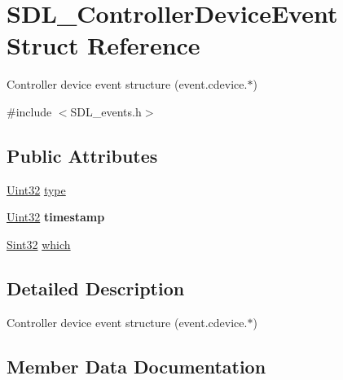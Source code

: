 \hypertarget{struct_s_d_l___controller_device_event}{}\section{S\+D\+L\+\_\+\+Controller\+Device\+Event Struct Reference}
\label{struct_s_d_l___controller_device_event}


Controller device event structure (event.\+cdevice.$\ast$)  




{\ttfamily \#include $<$S\+D\+L\+\_\+events.\+h$>$}

\subsection*{Public Attributes}
\begin{DoxyCompactItemize}
\item 
\hyperlink{_s_d_l__stdinc_8h_add440eff171ea5f55cb00c4a9ab8672d}{Uint32} \hyperlink{struct_s_d_l___controller_device_event_a45b3807eaf70a5f5cf712455da277536}{type}
\item 
\hypertarget{struct_s_d_l___controller_device_event_a62945795fc17f5000fddc80e2cf921b8}{}\hyperlink{_s_d_l__stdinc_8h_add440eff171ea5f55cb00c4a9ab8672d}{Uint32} {\bfseries timestamp}\label{struct_s_d_l___controller_device_event_a62945795fc17f5000fddc80e2cf921b8}

\item 
\hyperlink{_s_d_l__stdinc_8h_a7a90b941db9d4582e9ad7abb9940ff7e}{Sint32} \hyperlink{struct_s_d_l___controller_device_event_accb80de1619c1e790cffb6c888c915db}{which}
\end{DoxyCompactItemize}


\subsection{Detailed Description}
Controller device event structure (event.\+cdevice.$\ast$) 

\subsection{Member Data Documentation}
\hypertarget{struct_s_d_l___controller_device_event_a45b3807eaf70a5f5cf712455da277536}{}
